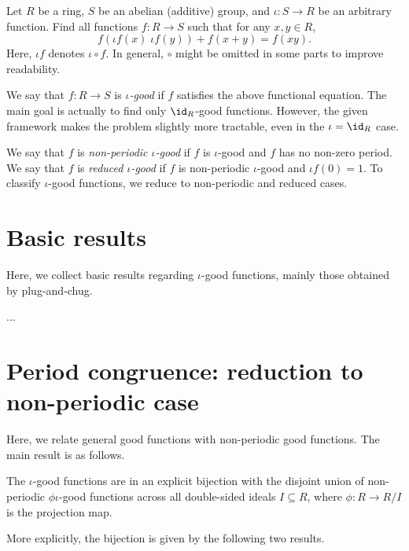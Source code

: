 Let $R$ be a ring, $S$ be an abelian (additive) group, and $\iota : S \to R$ be an arbitrary function.
Find all functions $f : R \to S$ such that for any $x, y \in R$,
\[ f(\iota f(x) \; \iota f(y)) + f(x + y) = f(xy). \tag{*}\label{2017a6-eq0} \]
Here, $\iota f$ denotes $\iota \circ f$.
In general, $\circ$ might be omitted in some parts to improve readability.


\hrulefill

We say that $f : R \to S$ is \emph{$\iota$-good} if $f$ satisfies the above functional equation.
The main goal is actually to find only $\id_R$-good functions.
However, the given framework makes the problem slightly more tractable, even in the $\iota = \id_R$ case.

We say that $f$ is \emph{non-periodic $\iota$-good} if $f$ is $\iota$-good and $f$ has no non-zero period.
We say that $f$ is \emph{reduced $\iota$-good} if $f$ is non-periodic $\iota$-good and $\iota f(0) = 1$.
To classify $\iota$-good functions, we reduce to non-periodic and reduced cases.





\section{Basic results}

Here, we collect basic results regarding $\iota$-good functions, mainly those obtained by plug-and-chug.


...





\section{Period congruence: reduction to non-periodic case}

Here, we relate general good functions with non-periodic good functions.
The main result is as follows.

\begin{theorem}
The $\iota$-good functions are in an explicit bijection with the disjoint union of non-periodic $\phi \iota$-good functions across all double-sided ideals $I \subseteq R$, where $\phi : R \to R/I$ is the projection map.
\end{theorem}

More explicitly, the bijection is given by the following two results.

